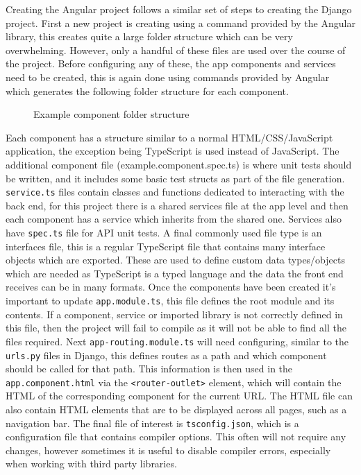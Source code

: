 Creating the Angular project follows a similar set of steps to creating the Django project. First a new project is creating using a command 
provided by the Angular library, this creates quite a large folder structure which can be very overwhelming. However, only a handful of these files 
are used over the course of the project. Before configuring any of these, the app components and services need to be created, this is again done using commands provided 
by Angular which generates the following folder structure for each component.
\begin{figure}[H]
    \caption{Example component folder structure}
\end{figure}
Each component has a structure similar to a normal HTML/CSS/JavaScript application, the exception being TypeScript is used instead of JavaScript.
The additional component file (example.component.spec.ts) is where unit tests should be written, and it includes some basic test structs as part of the 
file generation. \verb|service.ts| files contain classes and functions dedicated to interacting with the back end, for this project there is a shared services file at 
the app level and then each component has a service which inherits from the shared one. Services also have \verb|spec.ts| file for API unit tests.
A final commonly used file type is an interfaces file, this is a regular TypeScript file that contains many interface objects which are exported. 
These are used to define custom data types/objects which are needed as TypeScript is a typed language and the data the front end receives can be in many formats.
Once the components have been created it's important to update \verb|app.module.ts|, this file defines the root module and its contents. 
If a component, service or imported library is not correctly defined in this file, then the project will fail to compile as it will not be able to find all the files required.
Next \verb|app-routing.module.ts| will need configuring, similar to the \verb|urls.py| files in Django, this defines routes as a path and which component should be called for that path.
This information is then used in the \verb|app.component.html| via the \verb|<router-outlet>| element, which will contain the HTML of the corresponding component for the current URL.
The HTML file can also contain HTML elements that are to be displayed across all pages, such as a navigation bar.
The final file of interest is \verb|tsconfig.json|, which is a configuration file that contains compiler options. This often will not require any changes, however 
sometimes it is useful to disable compiler errors, especially when working with third party libraries.

